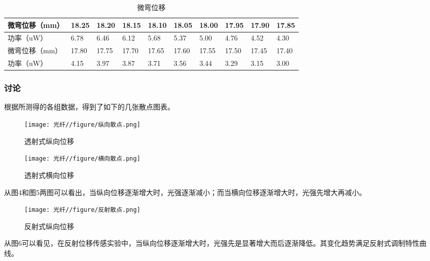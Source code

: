 \documentclass[UTF8]{ctexart}
\begin{document}
\vspace{1em}

\begin{table}[!h]
    \centering
    \begin{tabular}{|l|l|l|l|l|l|l|l|l|l|}
    \hline
    微弯位移（mm） & 18.25 & 18.20 & 18.15 & 18.10 & 18.05 & 18.00 & 17.95 & 17.90 & 17.85 \\ \hline
    功率（uW）   & 6.78  & 6.46  & 6.12  & 5.68  & 5.37  & 5.00  & 4.76  & 4.52  & 4.30  \\ \hline
    微弯位移（mm） & 17.80 & 17.75 & 17.70 & 17.65 & 17.60 & 17.55 & 17.50 & 17.45 & 17.40 \\ \hline
    功率（uW）   & 4.15  & 3.97  & 3.87  & 3.71  & 3.56  & 3.44  & 3.29  & 3.15  & 3.00  \\ \hline
    \end{tabular}
    \caption{微弯位移}
\end{table}

\vspace{1em}

\subsubsection{讨论}
根据所测得的各组数据，得到了如下的几张散点图表。


\vspace{1em}
\begin{figure}[!h]
    \centering
    \texttt{[image: 光纤//figure/纵向散点.png]}
    \caption{透射式纵向位移}
\end{figure}
\vspace{1em}

\begin{figure}[!h]
    \centering
    \texttt{[image: 光纤//figure/横向散点.png]}
    \caption{透射式横向位移}
\end{figure}
\vspace{1em}

从图4和图5两图可以看出，当纵向位移逐渐增大时，光强逐渐减小；而当横向位移逐渐增大时，光强先增大再减小。

\begin{figure}[!h]
    \centering
    \texttt{[image: 光纤//figure/反射散点.png]}
    \caption{反射式纵向位移}
\end{figure}
\vspace{1em}

从图6可以看见，在反射位移传感实验中，当纵向位移逐渐增大时，光强先是显著增大而后逐渐降低。其变化趋势满足反射式调制特性曲线。
\end{document}
